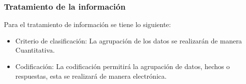 \subsubsection{Tratamiento de la información}

Para el tratamiento de información se tiene lo siguiente:

\begin{itemize}
\item Criterio de clasificación: La agrupación de los datos se realizarán de manera Cuantitativa.

\item Codificación: La codificación permitirá la agrupación de datos, hechos o respuestas, esta se realizará de manera electrónica.
\end{itemize}

\newpage